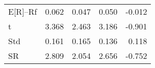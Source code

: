 \begin{tabular}{lrrrr}
\toprule
\midrule
E[R]--Rf & 0.062 & 0.047 & 0.050 & -0.012 \\
t & 3.368 & 2.463 & 3.186 & -0.901 \\
Std & 0.161 & 0.165 & 0.136 & 0.118 \\
SR & 2.809 & 2.054 & 2.656 & -0.752 \\
\bottomrule
\end{tabular}
